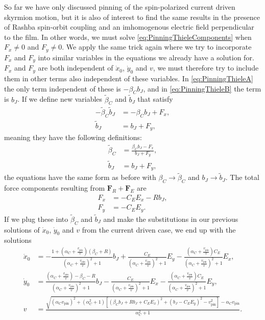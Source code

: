 So far we have only discussed pinning of the spin-polarized current driven skyrmion motion, but it is also of interest to find the same results in the presence of Rashba spin-orbit coupling and an imhomogenous electric field perpendicular to the film. In other words, we must solve \eqref{eq:PinningThieleComponents} when $F_x \neq 0$ and $F_y \neq 0$. We apply the same trick again where we try to incorporate $F_x$ and $F_y$ into similar variables in the equations we already have a solution for. $F_x$ and $F_y$ are both independent of $\dot{x}_0$, $\dot{y}_0$ and $v$, we must therefore try to include them in other terms also independent of these variables. In \eqref{eq:PinningThieleA} the only term independent of these is $-\beta_Cb_J$, and in \eqref{eq:PinningThieleB} the term is $b_J$. If we define new variables $\tilde{\beta}_C$ and $\tilde{b}_J$ that satisfy
\begin{subequations}
\begin{align}
-\tilde{\beta}_C\tilde{b}_J &= -\beta_Cb_J + F_x, \\
\tilde{b}_J &= b_J + F_y,
\end{align}
\end{subequations}
meaning they have the following definitions:
\begin{subequations}
\begin{align}
\tilde{\beta}_C &= \frac{\beta_Cb_J-F_x}{b_J+F_y}, \\
\tilde{b}_J &= b_J + F_y,
\end{align}
\end{subequations}
the equations have the same form as before with $\beta_C \rightarrow \tilde{\beta}_C$ and $b_J \rightarrow \tilde{b}_J$. The total force components resulting from $\mathbold{F}_R+\mathbold{F}_E$ are
\begin{subequations}
\begin{align}
F_x &= -C_E E_x - Rb_J, \\
F_y &= -C_E E_y.
\end{align}
\end{subequations}
If we plug these into $\tilde{\beta}_C$ and $\tilde{b}_J$ and make the substitutions in our previous solutions of $\dot{x}_0$, $\dot{y}_0$ and $v$ from the current driven case, we end up with the solutions
\begin{subequations}
\begin{align}
\dot{x}_0 &= -\frac{1+(\alpha_C+\frac{v_{\textrm{pin}}}{v})(\beta_C+R)}{(\alpha_C+\frac{v_{\textrm{pin}}}{v})^2+1}b_J + \frac{C_E}{(\alpha_C+\frac{v_{\textrm{pin}}}{v})^2+1}E_y - \frac{(\alpha_C+\frac{v_{\textrm{pin}}}{v})C_E}{(\alpha_C+\frac{v_{\textrm{pin}}}{v})^2+1}E_x, \\
\dot{y}_0 &= \frac{(\alpha_C+\frac{v_{\textrm{pin}}}{v})-\beta_C - R}{(\alpha_C+\frac{v_{\textrm{pin}}}{v})^2+1}b_J - \frac{C_E}{(\alpha_C+\frac{v_{\textrm{pin}}}{v})^2+1}E_x - \frac{(\alpha_C+\frac{v_{\textrm{pin}}}{v}) C_E}{(\alpha_C+\frac{v_{\textrm{pin}}}{v})^2+1}E_y, \\
\label{eq:PinningVElectrical}
v &= \frac{\sqrt{(\alpha_Cv_{\textrm{pin}})^2+(\alpha_C^2+1)\left[(\beta_Cb_J+Rb_J+
C_EE_x)^2+(b_J-C_EE_y)^2-v_{\textrm{pin}}^2\right]}-\alpha_Cv_{\textrm{pin}}}{\alpha_C^2+1}.
\end{align}
\end{subequations}
